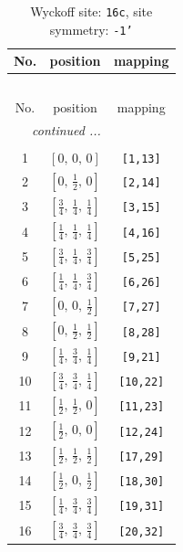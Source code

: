 \documentclass[fleqn,8pt]{jsarticle}
\begin{document}
\begin{longtable}{ccc}
\caption{Wyckoff site: {\tt 16c}, site symmetry: {\tt -1'}}
 \\
 \hline \hline
No. & position & mapping \\ \hline \endfirsthead

\multicolumn{2}{l}{\tablename\ \thetable{}} \\
 \hline \hline
No. & position & mapping \\ \hline \endhead

 \hline \hline
\multicolumn{2}{r}{\footnotesize\it continued ...} \\ \endfoot

 \hline \hline
\multicolumn{2}{r}{} \\ \endlastfoot

1 & $\left[ 0,\, 0,\, 0 \right]$ & {\tt [1,13]} \\ \hline
2 & $\left[ 0,\, \frac{1}{2},\, 0 \right]$ & {\tt [2,14]} \\ \hline
3 & $\left[ \frac{3}{4},\, \frac{1}{4},\, \frac{1}{4} \right]$ & {\tt [3,15]} \\ \hline
4 & $\left[ \frac{1}{4},\, \frac{1}{4},\, \frac{1}{4} \right]$ & {\tt [4,16]} \\ \hline
5 & $\left[ \frac{3}{4},\, \frac{1}{4},\, \frac{3}{4} \right]$ & {\tt [5,25]} \\ \hline
6 & $\left[ \frac{1}{4},\, \frac{1}{4},\, \frac{3}{4} \right]$ & {\tt [6,26]} \\ \hline
7 & $\left[ 0,\, 0,\, \frac{1}{2} \right]$ & {\tt [7,27]} \\ \hline
8 & $\left[ 0,\, \frac{1}{2},\, \frac{1}{2} \right]$ & {\tt [8,28]} \\ \hline
9 & $\left[ \frac{1}{4},\, \frac{3}{4},\, \frac{1}{4} \right]$ & {\tt [9,21]} \\ \hline
10 & $\left[ \frac{3}{4},\, \frac{3}{4},\, \frac{1}{4} \right]$ & {\tt [10,22]} \\ \hline
11 & $\left[ \frac{1}{2},\, \frac{1}{2},\, 0 \right]$ & {\tt [11,23]} \\ \hline
12 & $\left[ \frac{1}{2},\, 0,\, 0 \right]$ & {\tt [12,24]} \\ \hline
13 & $\left[ \frac{1}{2},\, \frac{1}{2},\, \frac{1}{2} \right]$ & {\tt [17,29]} \\ \hline
14 & $\left[ \frac{1}{2},\, 0,\, \frac{1}{2} \right]$ & {\tt [18,30]} \\ \hline
15 & $\left[ \frac{1}{4},\, \frac{3}{4},\, \frac{3}{4} \right]$ & {\tt [19,31]} \\ \hline
16 & $\left[ \frac{3}{4},\, \frac{3}{4},\, \frac{3}{4} \right]$ & {\tt [20,32]} \\
\end{longtable}
\end{document}
